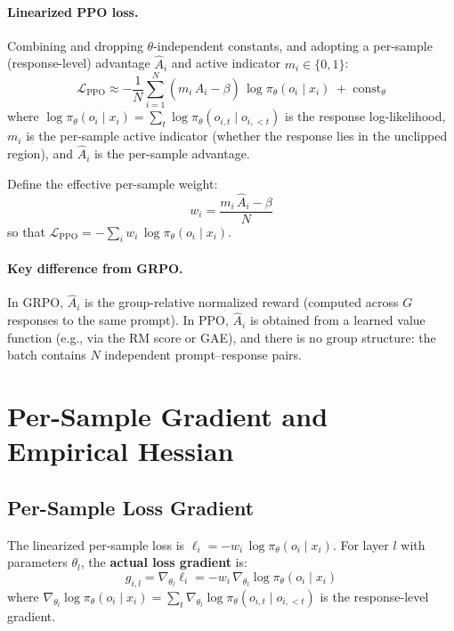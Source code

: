 \documentclass{article}
\begin{document}
\paragraph{Linearized PPO loss.}
Combining and dropping $\theta$-independent constants, and adopting a per-sample (response-level) advantage $\hat{A}_i$ and active indicator $m_i \in \{0,1\}$:
\begin{equation}\label{eq:linearized_ppo}
\boxed{
    \mathcal{L}_{\mathrm{PPO}}
    \approx -\frac{1}{N}\sum_{i=1}^{N}
    (m_i\,\hat{A}_i - \beta)\,\log\pi_\theta(o_i\mid x_i)
    \;+\;\mathrm{const}_\theta
}
\end{equation}
where $\log\pi_\theta(o_i\mid x_i) = \sum_t \log\pi_\theta(o_{i,t}\mid o_{i,<t})$ is the response log-likelihood, $m_i$ is the per-sample active indicator (whether the response lies in the unclipped region), and $\hat{A}_i$ is the per-sample advantage.

Define the effective per-sample weight:
\begin{equation}\label{eq:weight}
    w_i = \frac{m_i\,\hat{A}_i - \beta}{N}
\end{equation}
so that $\mathcal{L}_{\mathrm{PPO}} = -\sum_i w_i\,\log\pi_\theta(o_i\mid x_i)$.

\paragraph{Key difference from GRPO.}
In GRPO, $\hat{A}_i$ is the group-relative normalized reward (computed across $G$ responses to the same prompt).
In PPO, $\hat{A}_i$ is obtained from a learned value function (e.g., via the RM score or GAE), and there is no group structure: the batch contains $N$ independent prompt--response pairs.

\section{Per-Sample Gradient and Empirical Hessian}

\subsection{Per-Sample Loss Gradient}

The linearized per-sample loss is $\ell_i = -w_i\,\log\pi_\theta(o_i\mid x_i)$.
For layer $l$ with parameters $\theta_l$, the \textbf{actual loss gradient} is:
\begin{equation}\label{eq:loss_grad}
    g_{i,l} = \nabla_{\theta_l}\ell_i = -w_i\,\nabla_{\theta_l}\log\pi_\theta(o_i\mid x_i)
\end{equation}
where $\nabla_{\theta_l}\log\pi_\theta(o_i\mid x_i) = \sum_t \nabla_{\theta_l}\log\pi_\theta(o_{i,t}\mid o_{i,<t})$ is the response-level gradient.
\end{document}
